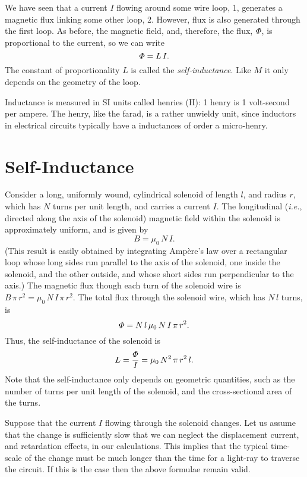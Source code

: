 We have seen that a current $I$ flowing around some wire loop, 1, generates a magnetic
flux linking some other loop, 2. However,  flux is also generated through the
first loop. As before, the magnetic field, and, therefore, the flux, ${\mit\Phi}$, 
is proportional to the current, so we can write
\begin{equation}
{\mit\Phi} = L\, I.
\end{equation}
The constant of proportionality $L$ is called the {\em self-inductance}. Like
$M$ it only depends on the geometry of the loop. 

Inductance is measured in SI units called henries (H): 1 henry is 1 volt-second
per ampere. The henry, like the farad, is a rather unwieldy unit, since
inductors in electrical circuits typically have a inductances of order a micro-henry. 

\section{Self-Inductance}
Consider a long, uniformly wound, cylindrical solenoid of length $l$, and radius $r$,
which has $N$ turns per unit length,
and carries a current $I$. The longitudinal ({\em i.e.}, directed along the
axis of the solenoid) magnetic field within the solenoid is approximately uniform,
and is given by
\begin{equation}
B= \mu_0\, N\, I.
\end{equation}
(This result is easily obtained by integrating Amp\`{e}re's law over a rectangular
loop whose long sides run parallel to the axis of the solenoid, one inside the
solenoid, and the other outside, and whose short sides run perpendicular to the
axis.) The magnetic flux though each turn of the solenoid wire is $B\,\pi \,r^2=
\mu_0\, N \,I\,\pi \,r^2$. The total flux through
the solenoid wire, which has $N\,l$ turns, is
\begin{equation}
{\mit\Phi} = N\,l\, \mu_0 \,N\,I\, \pi \,r^2.
\end{equation}
Thus, the self-inductance of the solenoid is
\begin{equation}
L = \frac{{\mit\Phi}}{I} = \mu_0\, N^2\, \pi\, r^2\, l.
\end{equation}
Note that the self-inductance only depends on geometric quantities, such as the number
of turns per unit length of the solenoid, and the cross-sectional area of the turns. 

Suppose that the current $I$ flowing through the solenoid changes. Let us
assume that the change is sufficiently slow that we can neglect the displacement
current, and retardation effects, in our calculations. This implies that the typical
time-scale of the change must be much longer than the time for a light-ray to traverse the
circuit. If this is the case then the above formulae remain valid. 

